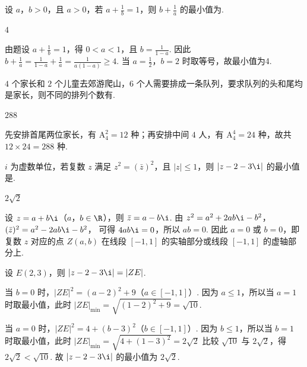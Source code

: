 \begin{problem}
设 \(a\)，\(b>0\)，且 \(a>0\)，若 \(a+\frac1b=1\)，则 \(b+\frac1a\) 的最小值为\fillinblank{}.
\end{problem}

\begin{answer}
\(4\)
\end{answer}

\begin{solution}
由题设 \(a+\frac1b=1\)，得 \(0<a<1\)，且 \(b=\frac1{1-a}\). 因此
\(b+\frac1a=\frac1{1-a}+\frac1a=\frac1{a(1-a)}\ge4\).
当 \(a=\frac12\)，\(b=2\) 时取等号，故最小值为4.
\end{solution}

\begin{problem}
\(4\) 个家长和 \(2\) 个儿童去郊游爬山，\(6\) 个人需要排成一条队列，要求队列的头和尾均是家长，则不同的排列个数有\fillinblank{}.
\end{problem}

\begin{answer}
\(288\)
\end{answer}

\begin{solution}
先安排首尾两位家长，有 \(\mathrm A_4^2=12\) 种；再安排中间 \(4\) 人，有 \(\mathrm A_4^4=24\) 种，故共 \(12\times24=288\) 种.
\end{solution}

\begin{problem}
\(i\) 为虚数单位，若复数 \(z\) 满足 \(z^2=(\bar z)^2\)，且 \(|z|\le1\)，则 \(|z-2-3\i|\) 的最小值是\fillinblank{}.
\end{problem}

\begin{answer}
\(2\sqrt2\)
\end{answer}

\begin{solution}
设 \(z=a+b\i\)（\(a\)，\(b\in\R\)），则 \(\bar z=a-b\i\). 由
\(z^2=a^2+2ab\i-b^2\)，\((\bar z)^2=a^2-2ab\i-b^2\)，
可得 \(4ab\i=0\)，所以 \(ab=0\).
因此 \(a=0\) 或 \(b=0\)，即复数 \(z\) 对应的点 \(Z(a,b)\) 在线段 \([-1,1]\) 的实轴部分或线段 \([-1,1]\) 的虚轴部分上.

设 \(E(2,3)\)，则 \(|z-2-3\i|=|ZE|\).

当 \(b=0\) 时，\(|ZE|^2=(a-2)^2+9\)（\(a\in[-1,1]\)）. 因为 \(a\le1\)，所以当 \(a=1\) 时取最小值，此时 \(|ZE|_{\min}=\sqrt{(1-2)^2+9}=\sqrt{10}\).

当 \(a=0\) 时，\(|ZE|^2=4+(b-3)^2\)（\(b\in[-1,1]\)）. 因为 \(b\le1\)，所以当 \(b=1\) 时取最小值，此时
\(
|ZE|_{\min}=\sqrt{4+(1-3)^2}=2\sqrt2
\)
比较 \(\sqrt{10}\) 与 \(2\sqrt2\)，得 \(2\sqrt2<\sqrt{10}\).
故 \(|z-2-3\i|\) 的最小值为 \(2\sqrt2\).
\end{solution}

